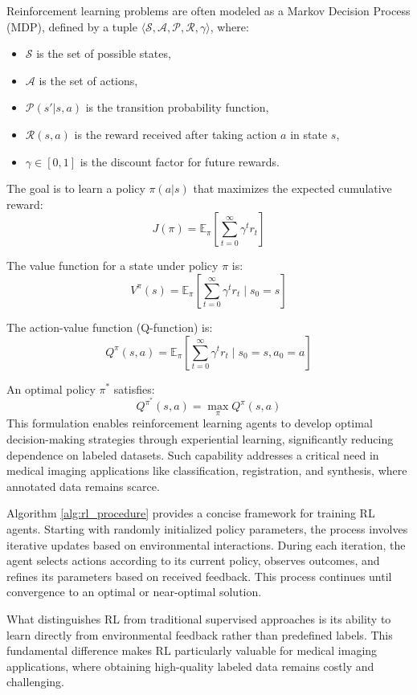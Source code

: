 \documentclass{article}
\begin{document}
Reinforcement learning problems are often modeled as a Markov Decision Process (MDP), defined by a tuple $\langle \mathcal{S}, \mathcal{A}, \mathcal{P}, \mathcal{R}, \gamma \rangle$, where:
\begin{itemize}
    \item $\mathcal{S}$ is the set of possible states,
    \item $\mathcal{A}$ is the set of actions,
    \item $\mathcal{P}(s' | s, a)$ is the transition probability function,
    \item $\mathcal{R}(s, a)$ is the reward received after taking action $a$ in state $s$,
    \item $\gamma \in [0, 1]$ is the discount factor for future rewards.
\end{itemize}

The goal is to learn a policy $\pi(a|s)$ that maximizes the expected cumulative reward:
\[
J(\pi) = \mathbb{E}_{\pi} \left[ \sum_{t=0}^{\infty} \gamma^t r_t \right]
\]

The value function for a state under policy $\pi$ is:
\[
V^{\pi}(s) = \mathbb{E}_{\pi} \left[ \sum_{t=0}^{\infty} \gamma^t r_t \mid s_0 = s \right]
\]

The action-value function (Q-function) is:
\[
Q^{\pi}(s, a) = \mathbb{E}_{\pi} \left[ \sum_{t=0}^{\infty} \gamma^t r_t \mid s_0 = s, a_0 = a \right]
\]

An optimal policy $\pi^*$ satisfies:
\[
Q^{\pi^*}(s, a) = \max_{\pi} Q^{\pi}(s, a)
\]
This formulation enables reinforcement learning agents to develop optimal decision-making strategies through experiential learning, significantly reducing dependence on labeled datasets. Such capability addresses a critical need in medical imaging applications like classification, registration, and synthesis, where annotated data remains scarce.

Algorithm \ref{alg:rl_procedure} provides a concise framework for training RL agents. Starting with randomly initialized policy parameters, the process involves iterative updates based on environmental interactions. During each iteration, the agent selects actions according to its current policy, observes outcomes, and refines its parameters based on received feedback. This process continues until convergence to an optimal or near-optimal solution.

What distinguishes RL from traditional supervised approaches is its ability to learn directly from environmental feedback rather than predefined labels. This fundamental difference makes RL particularly valuable for medical imaging applications, where obtaining high-quality labeled data remains costly and challenging.
\end{document}
